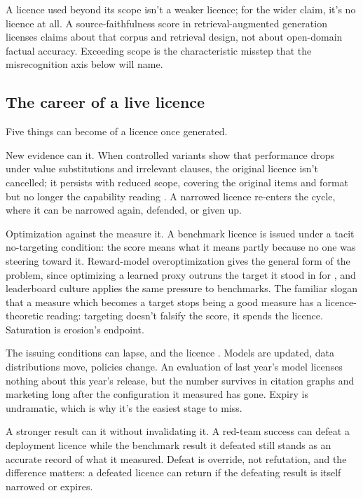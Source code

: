 \documentclass[12pt]{article}
\begin{document}
A licence used beyond its scope isn't a weaker
licence; for the wider claim, it's no licence at all. A source-faithfulness
score in retrieval-augmented generation licenses claims about that corpus and
retrieval design, not about open-domain factual accuracy. Exceeding scope is
the characteristic misstep that the misrecognition axis below will name.

\subsection{The career of a live licence}

Five things can become of a licence once generated.

New evidence can  it. When controlled variants show that
performance drops under value substitutions and irrelevant clauses, the
original licence isn't cancelled; it persists with reduced scope, covering the
original items and format but no longer the capability reading
\citep{mirzadeh2025gsm}. A narrowed licence re-enters the cycle, where it can
be narrowed again, defended, or given up.

Optimization against the measure  it. A benchmark licence is
issued under a tacit no-targeting condition: the score means what it means
partly because no one was steering toward it. Reward-model overoptimization
gives the general form of the problem, since optimizing a learned proxy outruns
the target it stood in for \citep{gao2023scaling}, and leaderboard culture
applies the same pressure to benchmarks. The familiar slogan that a measure
which becomes a target stops being a good measure has a licence-theoretic
reading: targeting doesn't falsify the score, it spends the licence. Saturation
is erosion's endpoint.

The issuing conditions can lapse, and the licence . Models are
updated, data distributions move, policies change. An evaluation of last
year's model licenses nothing about this year's release, but the number
survives in citation graphs and marketing long after the configuration it
measured has gone. Expiry is undramatic, which is why it's the easiest stage to
miss.

A stronger result can  it without invalidating it. A red-team
success can defeat a deployment licence while the benchmark result it defeated
still stands as an accurate record of what it measured. Defeat is override, not
refutation, and the difference matters: a defeated licence can return if the
defeating result is itself narrowed or expires.
\end{document}

